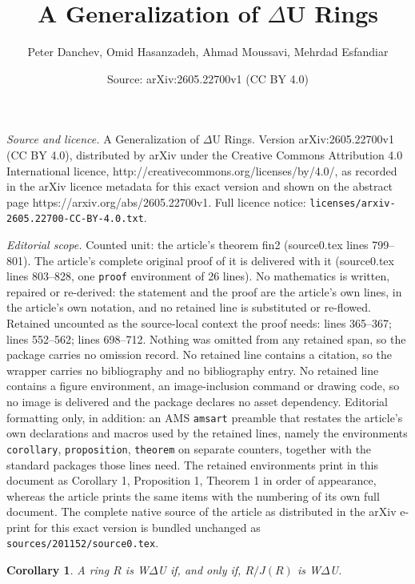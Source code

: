 \documentclass[10pt,a4paper]{amsart}
\title{A Generalization of $\Delta$U Rings}
\author{Peter Danchev, Omid Hasanzadeh, Ahmad Moussavi, Mehrdad Esfandiar}
\date{Source: arXiv:2605.22700v1 (CC BY 4.0)}
\newtheorem{corollary}{Corollary}
\begin{document}
\maketitle

\noindent\emph{Source and licence.} A Generalization of $\Delta$U Rings. Version arXiv:2605.22700v1 (CC BY 4.0), distributed by arXiv under the Creative Commons Attribution 4.0 International licence, http://creativecommons.org/licenses/by/4.0/, as recorded in the arXiv licence metadata for this exact version and shown on the abstract page https://arxiv.org/abs/2605.22700v1. Full licence notice: \texttt{licenses/arxiv-2605.22700-CC-BY-4.0.txt}.\par\smallskip

\noindent\textit{Editorial scope.} Counted unit: the article's theorem fin2 (source0.tex lines 799--801). The article's complete original proof of it is delivered with it (source0.tex lines 803--828, one \texttt{proof} environment of 26 lines). No mathematics is written, repaired or re-derived: the statement and the proof are the article's own lines, in the article's own notation, and no retained line is substituted or re-flowed.  Retained uncounted as the source-local context the proof needs: lines 365--367; lines 552--562; lines 698--712.  Nothing was omitted from any retained span, so the package carries no omission record.  No retained line contains a citation, so the wrapper carries no bibliography and no bibliography entry.  No retained line contains a figure environment, an image-inclusion command or drawing code, so no image is delivered and the package declares no asset dependency.  Editorial formatting only, in addition: an AMS \texttt{amsart} preamble that restates the article's own declarations and macros used by the retained lines, namely the environments \texttt{corollary}, \texttt{proposition}, \texttt{theorem} on separate counters, together with the standard packages those lines need.  The retained environments print in this document as Corollary 1, Proposition 1, Theorem 1 in order of appearance, whereas the article prints the same items with the numbering of its own full document.  The complete native source of the article as distributed in the arXiv e-print for this exact version is bundled unchanged as \texttt{sources/201152/source0.tex}.
\begin{corollary}\label{2}
A ring \(R\) is W$\Delta$U if, and only if, \(R/J(R)\) is W$\Delta$U.
\end{corollary}
\end{document}
